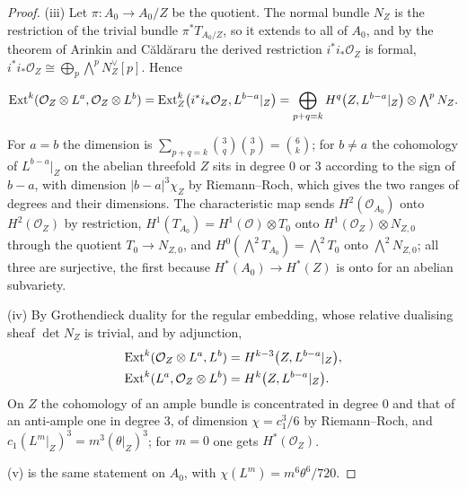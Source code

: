 \begin{proof}
(iii) Let $\pi\colon A_{0}\to A_{0}/Z$ be the quotient. The normal bundle $N_{Z}$ is the restriction of the trivial bundle $\pi^{*}T_{A_{0}/Z}$, so it extends to all of $A_{0}$, and by the theorem of Arinkin and C\u{a}ld\u{a}raru \cite{AC12} the derived restriction $i^{*}i_{*}\mathcal{O}_{Z}$ is formal, $i^{*}i_{*}\mathcal{O}_{Z}\cong\bigoplus_{p}\bigwedge^{p}N_{Z}^{\vee}[p]$. Hence
\begin{widetext}
\begin{equation}\label{eq:cmextz}
\mathrm{Ext}^{k}(\mathcal{O}_{Z}\otimes L^{a},\mathcal{O}_{Z}\otimes L^{b})=\mathrm{Ext}^{k}_{Z}\bigl(i^{*}i_{*}\mathcal{O}_{Z},L^{b-a}|_{Z}\bigr)=\bigoplus_{p+q=k}H^{q}\bigl(Z,L^{b-a}|_{Z}\bigr)\otimes\textstyle\bigwedge^{p}N_{Z}.
\end{equation}
\end{widetext}
For $a=b$ the dimension is $\sum_{p+q=k}\binom{3}{q}\binom{3}{p}=\binom{6}{k}$; for $b\ne a$ the cohomology of $L^{b-a}|_{Z}$ on the abelian threefold $Z$ sits in degree $0$ or $3$ according to the sign of $b-a$, with dimension $|b-a|^{3}\chi_{Z}$ by Riemann--Roch, which gives the two ranges of degrees and their dimensions. The characteristic map sends $H^{2}(\mathcal{O}_{A_{0}})$ onto $H^{2}(\mathcal{O}_{Z})$ by restriction, $H^{1}(T_{A_{0}})=H^{1}(\mathcal{O})\otimes T_{0}$ onto $H^{1}(\mathcal{O}_{Z})\otimes N_{Z,0}$ through the quotient $T_{0}\to N_{Z,0}$, and $H^{0}(\bigwedge^{2}T_{A_{0}})=\bigwedge^{2}T_{0}$ onto $\bigwedge^{2}N_{Z,0}$; all three are surjective, the first because $H^{*}(A_{0})\to H^{*}(Z)$ is onto for an abelian subvariety.

(iv) By Grothendieck duality for the regular embedding, whose relative dualising sheaf $\det N_{Z}$ is trivial, and by adjunction,
\begin{align*}
\mathrm{Ext}^{k}(\mathcal{O}_{Z}\otimes L^{a},L^{b})&=H^{k-3}\bigl(Z,L^{b-a}|_{Z}\bigr),\\
\mathrm{Ext}^{k}(L^{a},\mathcal{O}_{Z}\otimes L^{b})&=H^{k}\bigl(Z,L^{b-a}|_{Z}\bigr).
\end{align*}
On $Z$ the cohomology of an ample bundle is concentrated in degree $0$ and that of an anti-ample one in degree $3$, of dimension $\chi=c_{1}^{3}/6$ by Riemann--Roch, and $c_{1}(L^{m}|_{Z})^{3}=m^{3}(\theta|_{Z})^{3}$; for $m=0$ one gets $H^{*}(\mathcal{O}_{Z})$.

(v) is the same statement on $A_{0}$, with $\chi(L^{m})=m^{6}\theta^{6}/720$.
\end{proof}

